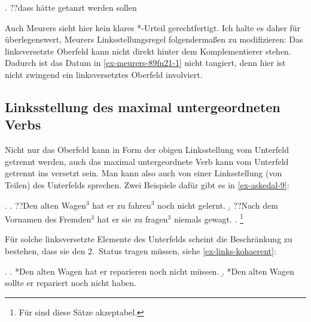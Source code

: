 \ex. \label{ex-meurers-89fn21-1} ??dass hätte getanzt werden sollen \hfill \citep[89, Fußnote 21]{Meurers:99}

Auch Meurers sieht hier kein klares *-Urteil gerechtfertigt. Ich halte es daher für überlegenswert, Meurers Linksstellungsregel folgenderma\ss en zu modifizieren: Das  linksversetzte Oberfeld kann nicht direkt hinter dem Komplementierer stehen. Dadurch ist das Datum in \ref{ex-meurers-89fn21-1} nicht tangiert, denn hier ist nicht zwingend ein linksversetztes Oberfeld involviert. 


\subsection{Linksstellung des maximal untergeordneten Verbs}

Nicht nur das Oberfeld kann in Form der obigen Linksstellung vom Unterfeld getrennt werden, auch das maximal untergeordnete Verb kann vom Unterfeld getrennt ins  versetzt sein. Man kann also auch von einer Linksstellung (von Teilen) des Unterfelds sprechen. Zwei Beispiele dafür gibt es  in \ref{ex-askedal-9}:

\ex. \label{ex-askedal-9}
\a. ??Den alten Wagen$^3$ hat er zu fahren$^3$ noch nicht gelernt.
\b. ??Nach dem Vornamen des Fremden$^3$ hat er sie zu fragen$^3$ niemals gewagt.
\z. \citep[(9)]{Askedal:83}\footnote{Für \citet[238]{Meurers:99} sind diese Sätze akzeptabel.}

Für solche linksversetzte Elemente des Unterfelds scheint die Beschränkung zu bestehen, dass sie den 2.~Status tragen müssen, siehe \ref{ex-links-kohaerent}: 

\ex. \label{ex-links-kohaerent}
\a. *Den alten Wagen hat er reparieren noch nicht müssen. 
\b. *Den alten Wagen sollte er repariert noch nicht haben. 

